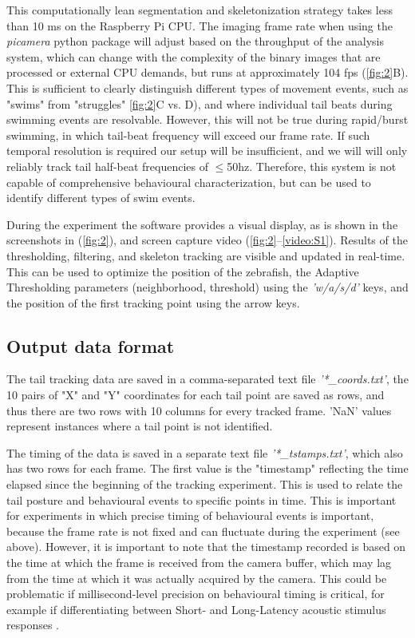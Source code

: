 \documentclass[9pt,lineno]{RandlettLab_elife}
\begin{document}
This computationally lean segmentation and skeletonization strategy takes less than 10 ms on the Raspberry Pi CPU. The imaging frame rate when using the \emph{picamera} python package will adjust based on the throughput of the analysis system, which can change with the complexity of the binary images that are processed or external CPU demands, but runs at approximately 104 fps (\autoref{fig:2}B). This is sufficient to clearly distinguish different types of movement events, such as "swims" from "struggles" \autoref{fig:2}C vs. D), and where individual tail beats during swimming events are resolvable. However, this will not be true during rapid/burst swimming, in which tail-beat frequency will exceed our frame rate. If such temporal resolution is required our setup will be insufficient, and we will will only reliably track tail half-beat frequencies of $\leq$50hz. Therefore, this system is not capable of comprehensive behavioural characterization, but can be used to identify different types of swim events. 

During the experiment the software provides a visual display, as is shown in the screenshots in (\autoref{fig:2}), and screen capture video (\autoref{fig:2}--\autoref{video:S1}). Results of the thresholding, filtering, and skeleton tracking are visible and updated in real-time. This can be used to optimize the position of the zebrafish, the Adaptive Thresholding parameters (neighborhood, threshold) using the \emph{'w/a/s/d'} keys, and the position of the first tracking point using the arrow keys.


\subsection{Output data format}

The tail tracking data are saved in a comma-separated text file \emph{'*\_coords.txt'}, the 10 pairs of "X" and "Y" coordinates for each tail point are saved as rows, and thus there are two rows with 10 columns for every tracked frame. 'NaN' values represent instances where a tail point is not identified. 

The timing of the data is saved in a separate text file \emph{'*\_tstamps.txt'}, which also has two rows for each frame. The first value is the "timestamp" reflecting the time elapsed since the beginning of the tracking experiment. This is used to relate the tail posture and behavioural events to specific points in time. This is important for experiments in which precise timing of behavioural events is important, because the frame rate is not fixed and can fluctuate during the experiment (see above). However, it is important to note that the timestamp recorded is based on the time at which the frame is received from the camera buffer, which may lag from the time at which it was actually acquired by the camera. This could be problematic if millisecond-level precision on behavioural timing is critical, for example if differentiating between Short- and Long-Latency acoustic stimulus responses \citep{Burgess2007}. 
\end{document}
